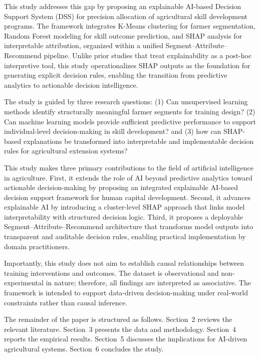 This study addresses this gap by proposing an explainable AI-based Decision Support System (DSS) for precision allocation of agricultural skill development programs. The framework integrates K-Means clustering for farmer segmentation, Random Forest modeling for skill outcome prediction, and SHAP analysis for interpretable attribution, organized within a unified Segment--Attribute--Recommend pipeline. Unlike prior studies that treat explainability as a post-hoc interpretive tool, this study operationalizes SHAP outputs as the foundation for generating explicit decision rules, enabling the transition from predictive analytics to actionable decision intelligence.

The study is guided by three research questions: (1) Can unsupervised learning methods identify structurally meaningful farmer segments for training design? (2) Can machine learning models provide sufficient predictive performance to support individual-level decision-making in skill development? and (3) how can SHAP-based explanations be transformed into interpretable and implementable decision rules for agricultural extension systems?

This study makes three primary contributions to the field of artificial intelligence in agriculture. First, it extends the role of AI beyond predictive analytics toward actionable decision-making by proposing an integrated explainable AI-based decision support framework for human capital development. Second, it advances explainable AI by introducing a cluster-level SHAP approach that links model interpretability with structured decision logic. Third, it proposes a deployable Segment--Attribute--Recommend architecture that transforms model outputs into transparent and auditable decision rules, enabling practical implementation by domain practitioners.

Importantly, this study does not aim to establish causal relationships between training interventions and outcomes. The dataset is observational and non-experimental in nature; therefore, all findings are interpreted as associative. The framework is intended to support data-driven decision-making under real-world constraints rather than causal inference.

The remainder of the paper is structured as follows. Section~2 reviews the relevant literature. Section~3 presents the data and methodology. Section~4 reports the empirical results. Section~5 discusses the implications for AI-driven agricultural systems. Section~6 concludes the study.